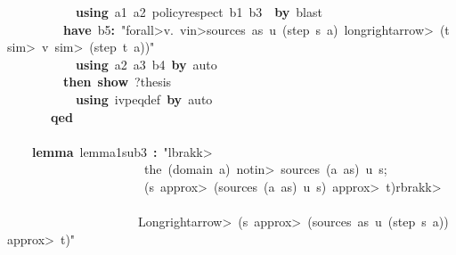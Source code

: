 \documentclass{article}
\newcommand{\syntaxKEYWORDA}[1]{\textcolor[rgb]{0.0,0.4,0.6}{\textbf{#1}}}
\newcommand{\syntaxKEYWORDC}[1]{\textcolor[rgb]{0.0,0.6,1.0}{\textbf{#1}}}
\newcommand{\syntaxLITERALA}[1]{\textcolor[rgb]{1.0,0.0,0.8}{#1}}
\newcommand{\syntaxOPERATOR}[1]{\textcolor[rgb]{0.0,0.0,0.0}{\textbf{#1}}}
\newcommand{\syntaxKEYWORDA}[1]{\textcolor[rgb]{0.0,0.4,0.6}{\textbf{#1}}}
\newcommand{\syntaxKEYWORDC}[1]{\textcolor[rgb]{0.0,0.6,1.0}{\textbf{#1}}}
\newcommand{\syntaxLITERALA}[1]{\textcolor[rgb]{1.0,0.0,0.8}{#1}}
\newcommand{\syntaxOPERATOR}[1]{\textcolor[rgb]{0.0,0.0,0.0}{\textbf{#1}}}
\newcommand{\syntaxKEYWORDA}[1]{\textcolor[rgb]{0.0,0.4,0.6}{\textbf{#1}}}
\newcommand{\syntaxKEYWORDC}[1]{\textcolor[rgb]{0.0,0.6,1.0}{\textbf{#1}}}
\newcommand{\syntaxLITERALA}[1]{\textcolor[rgb]{1.0,0.0,0.8}{#1}}
\newcommand{\syntaxOPERATOR}[1]{\textcolor[rgb]{0.0,0.0,0.0}{\textbf{#1}}}
\newcommand{\syntaxKEYWORDA}[1]{\textcolor[rgb]{0.0,0.4,0.6}{#1}}
\newcommand{\syntaxKEYWORDC}[1]{\textcolor[rgb]{0.0,0.6,1.0}{#1}}
\newcommand{\syntaxLITERALA}[1]{\textcolor[rgb]{1.0,0.0,0.8}{\textbf{#1}}}
\newcommand{\syntaxOPERATOR}[1]{\textcolor[rgb]{0.0,0.0,0.0}{#1}}
\newcommand{\syntaxKEYWORDA}[1]{\textcolor[rgb]{0.0,0.4,0.6}{\textbf{#1}}}
\newcommand{\syntaxKEYWORDC}[1]{\textcolor[rgb]{0.0,0.6,1.0}{\textbf{#1}}}
\newcommand{\syntaxLITERALA}[1]{\textcolor[rgb]{1.0,0.0,0.8}{#1}}
\newcommand{\syntaxOPERATOR}[1]{\textcolor[rgb]{0.0,0.0,0.0}{\textbf{#1}}}
\newcommand{\syntaxKEYWORDA}[1]{\textcolor[rgb]{0.0,0.4,0.6}{\textbf{#1}}}
\newcommand{\syntaxKEYWORDC}[1]{\textcolor[rgb]{0.0,0.6,1.0}{\textbf{#1}}}
\newcommand{\syntaxLITERALA}[1]{\textcolor[rgb]{1.0,0.0,0.8}{#1}}
\newcommand{\syntaxOPERATOR}[1]{\textcolor[rgb]{0.0,0.0,0.0}{\textbf{#1}}}
\begin{document}
{\ }{\ }{\ }{\ }{\ }{\ }{\ }{\ }{\ }{\ }{\ }{\ }\syntaxKEYWORDA{using}{\ }a1{\ }a2{\ }policy\usebox{\underscorebox}respect{\ }b1{\ }b3{\ }{\ }\syntaxKEYWORDA{by}{\ }blast\hspace*{\fill}\\
{\ }{\ }{\ }{\ }{\ }{\ }{\ }{\ }{\ }{\ }\syntaxKEYWORDA{have}{\ }b5\syntaxOPERATOR{:}{\ }\syntaxLITERALA{"\<forall>v.{\ }v\<in>sources{\ }as{\ }u{\ }(step{\ }s{\ }a){\ }\<longrightarrow>{\ }(t{\ }\<sim>{\ }v{\ }\<sim>{\ }(step{\ }t{\ }a))"}\hspace*{\fill}\\
{\ }{\ }{\ }{\ }{\ }{\ }{\ }{\ }{\ }{\ }{\ }{\ }\syntaxKEYWORDA{using}{\ }a2{\ }a3{\ }b4{\ }\syntaxKEYWORDA{by}{\ }auto\hspace*{\fill}\\
{\ }{\ }{\ }{\ }{\ }{\ }{\ }{\ }{\ }{\ }\syntaxKEYWORDA{then}{\ }\syntaxKEYWORDC{show}{\ }?thesis\hspace*{\fill}\\
{\ }{\ }{\ }{\ }{\ }{\ }{\ }{\ }{\ }{\ }{\ }{\ }\syntaxKEYWORDA{using}{\ }ivpeq\usebox{\underscorebox}def{\ }\syntaxKEYWORDA{by}{\ }auto\hspace*{\fill}\\
{\ }{\ }{\ }{\ }{\ }{\ }{\ }{\ }\syntaxKEYWORDA{qed}\hspace*{\fill}\\
\hspace*{\fill}\\
{\ }{\ }{\ }{\ }{\ }\syntaxKEYWORDA{lemma}{\ }lemma\usebox{\underscorebox}1\usebox{\underscorebox}sub\usebox{\underscorebox}3{\ }\syntaxOPERATOR{:}{\ }\syntaxLITERALA{"\<lbrakk>}\hspace*{\fill}\\
\syntaxLITERALA{{\ }{\ }{\ }{\ }{\ }{\ }{\ }{\ }{\ }{\ }{\ }{\ }{\ }{\ }{\ }{\ }{\ }{\ }{\ }{\ }{\ }{\ }{\ }the{\ }(domain{\ }a){\ }\<notin>{\ }sources{\ }(a{\ }\usebox{\hashbox}{\ }as){\ }u{\ }s;}\hspace*{\fill}\\
\syntaxLITERALA{{\ }{\ }{\ }{\ }{\ }{\ }{\ }{\ }{\ }{\ }{\ }{\ }{\ }{\ }{\ }{\ }{\ }{\ }{\ }{\ }{\ }{\ }{\ }(s{\ }\<approx>{\ }(sources{\ }(a{\ }\usebox{\hashbox}{\ }as){\ }u{\ }s){\ }\<approx>{\ }t)\<rbrakk>{\ }{\ }{\ }{\ }{\ }}\hspace*{\fill}\\
\syntaxLITERALA{{\ }{\ }{\ }{\ }{\ }{\ }{\ }{\ }{\ }{\ }{\ }{\ }{\ }{\ }{\ }{\ }{\ }{\ }{\ }{\ }{\ }{\ }\<Longrightarrow>{\ }(s{\ }\<approx>{\ }(sources{\ }as{\ }u{\ }(step{\ }s{\ }a)){\ }\<approx>{\ }t)"}\hspace*{\fill}\\
\end{document}
